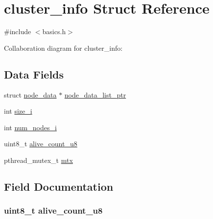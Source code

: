 \hypertarget{structcluster__info}{}\section{cluster\+\_\+info Struct Reference}
\label{structcluster__info}


{\ttfamily \#include $<$basics.\+h$>$}



Collaboration diagram for cluster\+\_\+info\+:
\subsection*{Data Fields}
\begin{DoxyCompactItemize}
\item 
struct \hyperlink{structnode__data}{node\+\_\+data} $\ast$ \hyperlink{structcluster__info_a91dfea1717d57e65d6f0bbcd3916d5cf}{node\+\_\+data\+\_\+list\+\_\+ptr}
\item 
int \hyperlink{structcluster__info_ab55c14162544e8f537b897619704e7e8}{size\+\_\+i}
\item 
int \hyperlink{structcluster__info_a9ec723e70de19c5ea3598c01b58f0733}{num\+\_\+nodes\+\_\+i}
\item 
uint8\+\_\+t \hyperlink{structcluster__info_a924ff505a27aa3841de1e11f2925a16a}{alive\+\_\+count\+\_\+u8}
\item 
pthread\+\_\+mutex\+\_\+t \hyperlink{structcluster__info_a2680f9fe5653a596c7e779b838180fdc}{mtx}
\end{DoxyCompactItemize}


\subsection{Field Documentation}
\hypertarget{structcluster__info_a924ff505a27aa3841de1e11f2925a16a}{}
\subsubsection[{alive\+\_\+count\+\_\+u8}]{\setlength{\rightskip}{0pt plus 5cm}uint8\+\_\+t alive\+\_\+count\+\_\+u8}\label{structcluster__info_a924ff505a27aa3841de1e11f2925a16a}
\hypertarget{structcluster__info_a2680f9fe5653a596c7e779b838180fdc}{}
